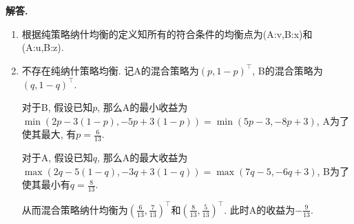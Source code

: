 \documentclass[11pt]{article}
\newenvironment{solution}{\par\noindent\textbf{解答. }}{\par}
\begin{document}
	\section{}
	\begin{solution}
		\begin{enumerate}[(1)]
			\item 根据纯策略纳什均衡的定义知所有的符合条件的均衡点为(A:v,B:x)和(A:u,B:z).
			\item 不存在纯纳什策略均衡.
			记A的混合策略为$(p,1-p)^\top$, B的混合策略为$(q,1-q)^\top$.

			对于B, 假设已知$p$, 那么A的最小收益为$\min(2p-3(1-p),-5p+3(1-p))=\min(5p-3,-8p+3)$, A为了使其最大, 有$p=\frac{6}{13}$.

			对于A, 假设已知$q$, 那么A的最大收益为$\max(2q-5(1-q),-3q+3(1-q))=\max(7q-5,-6q+3)$, B为了使其最小有$q=\frac{8}{13}$.

			从而混合策略纳什均衡为$(\frac{6}{13},\frac{7}{13})^\top$和$(\frac{8}{13},\frac{5}{13})^\top$. 此时A的收益为$-\frac{9}{13}$.
		\end{enumerate}
	\end{solution}
\end{document}
